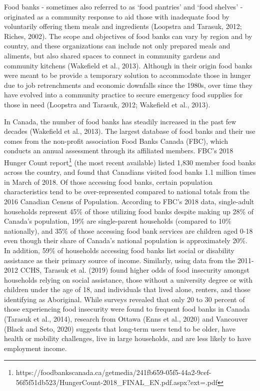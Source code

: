\documentclass[]{elsarticle} %
\begin{document}
Food banks - sometimes also referred to as `food pantries' and `food
shelves' - originated as a community response to aid those with
inadequate food by voluntarily offering them meals and ingredients
(Loopstra and Tarasuk, 2012; Riches, 2002). The scope and objectives of
food banks can vary by region and by country, and these organizations
can include not only prepared meals and aliments, but also shared spaces
to connect in community gardens and community kitchens (Wakefield et
al., 2013). Although in their origin food banks were meant to be provide
a temporary solution to accommodate those in hunger due to job
retrenchments and economic downfalls since the 1980s, over time they
have evolved into a community practice to secure emergency food supplies
for those in need (Loopstra and Tarasuk, 2012; Wakefield et al., 2013).

In Canada, the number of food banks has steadily increased in the past
few decades (Wakefield et al., 2013). The largest database of food banks
and their use comes from the non-profit association Food Banks Canada
(FBC), which conducts an annual assessment through its affiliated
members. FBC's 2018 Hunger Count report\footnote{https://foodbankscanada.ca/getmedia/241fb659-05f5-44a2-9cef-56f5f51db523/HungerCount-2018\_FINAL\_EN.pdf.aspx?ext=.pdf}
(the most recent available) listed 1,830 member food banks across the
country, and found that Canadians visited food banks 1.1 million times
in March of 2018. Of those accessing food banks, certain population
characteristics tend to be over-represented compared to national totals
from the 2016 Canadian Census of Population. According to FBC's 2018
data, single-adult households represent 45\% of those utilizing food
banks despite making up 28\% of Canada's population, 19\% are
single-parent households (compared to 10\% nationally), and 35\% of
those accessing food bank services are children aged 0-18 even though
their share of Canada's national population is approximately 20\%. In
addition, 59\% of households accessing food banks list social or
disability assistance as their primary source of income. Similarly,
using data from the 2011-2012 CCHS, Tarasuk et al. (2019) found higher
odds of food insecurity amongst households relying on social assistance,
those without a university degree or with children under the age of 18,
and individuals that lived alone, renters, and those identifying as
Aboriginal. While surveys revealed that only 20 to 30 percent of those
experiencing food insecurity were found to frequent food banks in Canada
(Tarasuk et al., 2014), research from Ottawa (Enns et al., 2020) and
Vancouver (Black and Seto, 2020) suggests that long-term users tend to
be older, have health or mobility challenges, live in large households,
and are less likely to have employment income.
\end{document}

